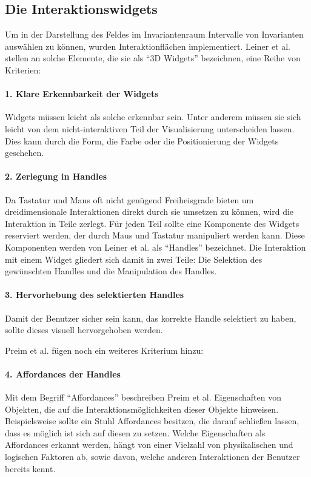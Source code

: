 \documentclass[a4paper,fontsize=12pt,toc=bib,halfparskip]{scrartcl}
\begin{document}
\subsection{Die Interaktionswidgets}
\label{sec:Widget}
Um in der Darstellung des Feldes im Invariantenraum Intervalle von Invarianten ausw\"ahlen zu k\"onnen, wurden Interaktionfl\"achen implementiert. Leiner et al. \cite{leiner1997entwicklung} stellen an solche Elemente, die sie als ``3D Widgets'' bezeichnen, eine Reihe von Kriterien:

\paragraph{1. Klare Erkennbarkeit der Widgets}
Widgets m\"ussen leicht als solche erkennbar sein. Unter anderem m\"ussen sie sich leicht von dem nicht-interaktiven Teil der Visualisierung unterscheiden lassen. Dies kann durch die Form, die Farbe oder die Positionierung der Widgets geschehen.

\paragraph{2. Zerlegung in Handles}
Da Tastatur und Maus oft nicht gen\"ugend Freiheisgrade bieten um dreidimensionale Interaktionen direkt durch sie umsetzen zu k\"onnen, wird die Interaktion in Teile zerlegt. F\"ur jeden Teil sollte eine Komponente des Widgets reserviert werden, der durch Maus und Tastatur manipuliert werden kann. Diese Komponenten werden von Leiner et al. als ``Handles'' bezeichnet. Die Interaktion mit einem Widget gliedert sich damit in zwei Teile: Die Selektion des gew\"unschten Handles und die Manipulation des Handles.

\paragraph{3. Hervorhebung des selektierten Handles}
Damit der Benutzer sicher sein kann, das korrekte Handle selektiert zu haben, sollte dieses visuell hervorgehoben werden.

Preim et al. \cite[S.~340]{preim2015interaktive} f\"ugen noch ein weiteres Kriterium hinzu:

\paragraph{4. Affordances der Handles}
Mit dem Begriff ``Affordances'' beschreiben Preim et al. \cite[S.~137]{preim2010interaktive} Eigenschaften von Objekten, die auf die Interaktionsm\"oglichkeiten dieser Objekte hinweisen. Beispielsweise sollte ein Stuhl Affordances besitzen, die darauf schlie{\ss}en lassen, dass es m\"oglich ist sich auf diesen zu setzen. Welche Eigenschaften als Affordances erkannt werden, h\"angt von einer Vielzahl von physikalischen und logischen Faktoren ab, sowie davon, welche anderen Interaktionen der Benutzer bereits kennt.
\end{document}
